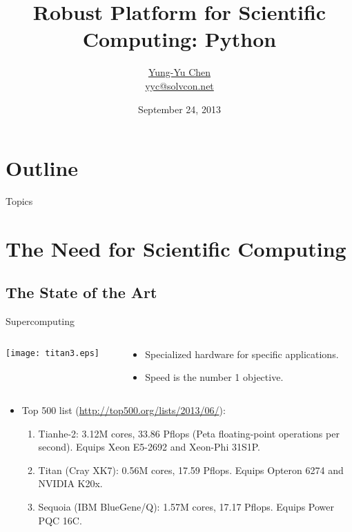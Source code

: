 \documentclass[dvips,xcolor=pst,14pt]{beamer}
\title[SciPy]{Robust Platform for Scientific Computing: Python}
\author[\href{http://solvcon.net/yyc/}{Yung-Yu Chen}]%
{\href{http://solvcon.net/yyc/}{Yung-Yu Chen} \\ {\scriptsize
\url{yyc@solvcon.net}}}
\institute[PyHUG]{Python Hsinchu User Group}
\date[2013/9/24]{September 24, 2013}
\begin{document}
\begin{frame}
\titlepage
\end{frame}

\section*{
Outline
}

\begin{frame}{
%
Topics
%
}
\tableofcontents
\end{frame}

\section{
The Need for Scientific Computing
}

\subsection{
The State of the Art
}

\begin{frame}{
%
Supercomputing
%
}
\begin{columns}
  \begin{column}{0.25\textwidth}
    \centering
    \texttt{[image: titan3.eps]}
  \end{column}
  \begin{column}{0.75\textwidth}
    \begin{itemize}
      \item Specialized hardware for specific applications.
      \item \alert{Speed} is the number 1 objective.
    \end{itemize}
  \end{column}
\end{columns}
\begin{itemize}
\item Top 500 list ({\small\url{http://top500.org/lists/2013/06/}}):
\begin{enumerate}
  \item Tianhe-2: 3.12M cores, 33.86 Pflops (Peta floating-point operations per
  second).  Equips Xeon E5-2692 and Xeon-Phi 31S1P.
  \item Titan (Cray XK7): 0.56M cores, 17.59 Pflops.  Equips Opteron 6274 and
  NVIDIA K20x.
  \item Sequoia (IBM BlueGene/Q): 1.57M cores, 17.17 Pflops.  Equips Power PQC 16C.
\end{enumerate}
\end{itemize}
\end{frame}
\end{document}
